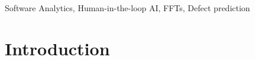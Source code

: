 \documentclass[10pt,conference]{IEEEtran}
\newcommand{\be}{\begin{enumerate}[leftmargin=0.4cm]}
\newcommand{\ee}{\end{enumerate}}
\begin{document}
 
 
\begin{IEEEkeywords}
Software Analytics, Human-in-the-loop AI, FFTs,  Defect prediction
\end{IEEEkeywords}

 

\maketitle
\section{Introduction}




\end{document}

